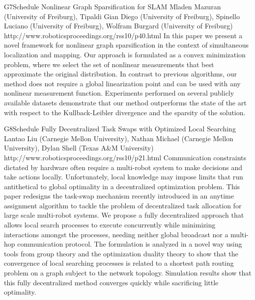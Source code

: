 \begin{spacing}{1.0}
\descriptionPaper
{G7}{Schedule}
{	
Nonlinear Graph Sparsification for SLAM
}
{
Mladen Mazuran (University of Freiburg), Tipaldi Gian Diego (University of Freiburg), Spinello Luciano (University of Freiburg), Wolfram Burgard (University of Freiburg)
}
{
http://www.roboticsproceedings.org/rss10/p40.html
}
{
In this paper we present a novel framework for nonlinear graph sparsification in the context of simultaneous localization and mapping. Our approach is formulated as a convex minimization problem, where we select the set of nonlinear measurements that best approximate the original distribution. In contrast to previous algorithms, our method does not require a global linearization point and can be used with any nonlinear measurement function. Experiments performed on several publicly available datasets demonstrate that our method outperforms the state of the art with respect to the Kullback-Leibler divergence and the sparsity of the solution.
}


\descriptionPaper
{G8}{Schedule}
{	
Fully Decentralized Task Swaps with Optimized Local Searching
}
{
Lantao Liu (Carnegie Mellon University), Nathan Michael (Carnegie Mellon University), Dylan Shell (Texas A\&M University)
}
{
http://www.roboticsproceedings.org/rss10/p21.html
}
{
Communication constraints dictated by hardware often require a multi-robot system to make decisions and take actions locally. Unfortunately, local knowledge may impose limits that run antithetical to global optimality in a decentralized optimization problem. This paper redesigns the task-swap mechanism recently introduced in an anytime assignment algorithm to tackle the problem of decentralized task allocation for large scale multi-robot systems. We propose a fully decentralized approach that allows local search processes to execute concurrently while minimizing interactions amongst the processes, needing neither global broadcast nor a multi-hop communication protocol. The formulation is analyzed in a novel way using tools from group theory and the optimization duality theory to show that the convergence of local searching processes is related to a shortest path routing problem on a graph subject to the network topology. Simulation results show that this fully decentralized method converges quickly while sacrificing little optimality.
}






\end{spacing}
